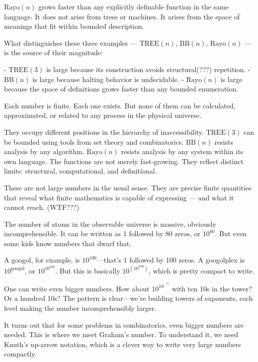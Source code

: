 $\mathrm{Rayo}(n)$ grows faster than any explicitly definable function in the same language. It does not arise from trees or machines. It arises from the space of meanings that fit within bounded description.

What distinguishes these three examples — $\mathrm{TREE}(n)$, $\mathrm{BB}(n)$, $\mathrm{Rayo}(n)$ — is the source of their magnitude:

- $\mathrm{TREE}(3)$ is large because its construction avoids structural(???) repetition.
- $\mathrm{BB}(n)$ is large because halting behavior is undecidable.
- $\mathrm{Rayo}(n)$ is large because the space of definitions grows faster than any bounded enumeration.

Each number is finite. Each one exists. But none of them can be calculated, approximated, or related to any process in the physical universe.

They occupy different positions in the hierarchy of inaccessibility. $\mathrm{TREE}(3)$ can be bounded using tools from set theory and combinatorics. $\mathrm{BB}(n)$ resists analysis by any algorithm. $\mathrm{Rayo}(n)$ resists analysis by any system within its own language. The functions are not merely fast-growing. They reflect distinct limits: structural, computational, and definitional.

These are not large numbers in the usual sense. They are precise finite quantities that reveal what finite mathematics is capable of expressing — and what it cannot reach. (WTF???)





The number of atoms in the observable universe is massive, obviously incomprehensible. It can be written as 1 followed by 80 zeros, or $10^{80}$. But even some kids know numbers that dwarf that.

A googol, for example, is $10^{100}$—that's 1 followed by 100 zeros. A googolplex is $10^{\text{googol}}$, or $10^{10^{100}}$. But this is basically $10^{(10^{100})}$, which is pretty compact to write.

One can write even bigger numbers. How about $10^{10^{\cdots^{10}}}$ with ten 10s in the tower? Or a hundred 10s? The pattern is clear—we're building towers of exponents, each level making the number incomprehensibly larger.

It turns out that for some problems in combinatorics, even bigger numbers are needed. This is where we meet Graham's number. To understand it, we need Knuth's up-arrow notation, which is a clever way to write very large numbers compactly.

